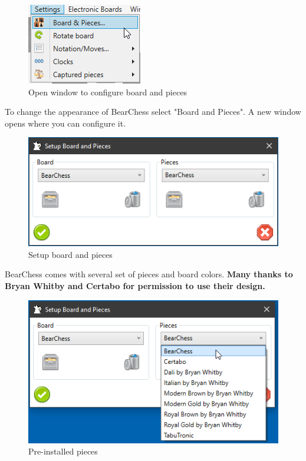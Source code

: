 \documentclass[11pt,a4paper]{article}
\begin{document}
	\begin{figure}[H]
		\centering
		\includegraphics[scale=1.0]{SettingsBoardAndPieces.png}
		\caption{Open window to configure board and pieces }
		\label{fig:SettingsBoardAndPieces}
	\end{figure}
	
	To change the appearance of BearChess select "Board and Pieces". A new window opens where you can configure it. 
	
	\begin{figure}[H]
		\centering
		\includegraphics[scale=0.9]{SettingsBoardAndPieces2.png}
		\caption{Setup board and pieces }
		\label{fig:SettingsBoardAndPieces2}
	\end{figure}
	
	BearChess comes with several set of pieces and board colors. \textbf{Many thanks to Bryan Whitby and Certabo for permission to use their design.}
	
	\begin{figure}[H]
		\centering
		\includegraphics[scale=0.9]{SettingsBoardAndPieces3.png}
		\caption{Pre-installed pieces }
		\label{fig:SettingsBoardAndPieces3}
	\end{figure}
	
\end{document}
